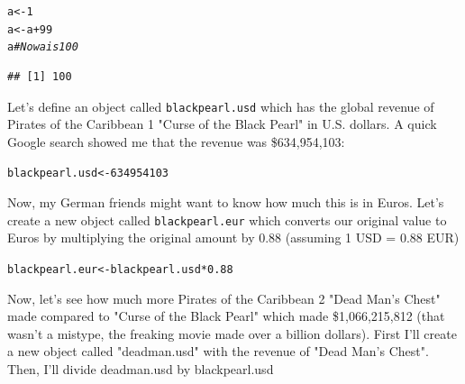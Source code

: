 \documentclass{tufte-book}\usepackage[]{graphicx}\usepackage[]{color}
\makeatletter
\newcommand{\hlnum}[1]{\textcolor[rgb]{0.686,0.059,0.569}{#1}}%
\newcommand{\hlcom}[1]{\textcolor[rgb]{0.678,0.584,0.686}{\textit{#1}}}%
\newcommand{\hlopt}[1]{\textcolor[rgb]{0,0,0}{#1}}%
\newcommand{\hlstd}[1]{\textcolor[rgb]{0.345,0.345,0.345}{#1}}%
\newcommand{\hlkwb}[1]{\textcolor[rgb]{0.69,0.353,0.396}{#1}}%
\newenvironment{kframe}{%
 \def\at@end@of@kframe{}%
 \ifinner\ifhmode%
  \def\at@end@of@kframe{\end{minipage}}%
  \begin{minipage}{\columnwidth}%
 \fi\fi%
 \def\FrameCommand##1{\hskip\@totalleftmargin \hskip-\fboxsep
 \colorbox{shadecolor}{##1}\hskip-\fboxsep
     \hskip-\linewidth \hskip-\@totalleftmargin \hskip\columnwidth}%
 \MakeFramed {\advance\hsize-\width
   \@totalleftmargin\z@ \linewidth\hsize
   \@setminipage}}%
 {\par\unskip\endMakeFramed%
 \at@end@of@kframe}
\newenvironment{knitrout}{}{} %
\makeatother
\begin{document}

\begin{marginfigure}
\begin{knitrout}
\color{fgcolor}\begin{kframe}
\begin{alltt}
\hlstd{a} \hlkwb{<-} \hlnum{1}
\hlstd{a} \hlkwb{<-} \hlstd{a} \hlopt{+} \hlnum{99}
\hlstd{a} \hlcom{# Now a is 100}
\end{alltt}
\begin{verbatim}
## [1] 100
\end{verbatim}
\end{kframe}
\end{knitrout}
\end{marginfigure}


Let's define an object called \texttt{blackpearl.usd} which has the global revenue of Pirates of the Caribbean 1 "Curse of the Black Pearl" in U.S. dollars. A quick Google search showed me that the revenue was \$634,954,103:

\begin{knitrout}
\color{fgcolor}\begin{kframe}
\begin{alltt}
\hlstd{blackpearl.usd} \hlkwb{<-} \hlnum{634954103}
\end{alltt}
\end{kframe}
\end{knitrout}

Now, my German friends might want to know how much this is in Euros. Let's create a new object called \texttt{blackpearl.eur} which converts our original value to Euros by multiplying the original amount by 0.88 (assuming 1 USD = 0.88 EUR)

\begin{knitrout}
\color{fgcolor}\begin{kframe}
\begin{alltt}
\hlstd{blackpearl.eur} \hlkwb{<-} \hlstd{blackpearl.usd} \hlopt{*} \hlnum{0.88}
\end{alltt}
\end{kframe}
\end{knitrout}


Now, let's see how much more Pirates of the Caribbean 2 "Dead Man's Chest" made compared to "Curse of the Black Pearl" which made \$1,066,215,812 (that wasn't a mistype, the freaking movie made over a billion dollars). First I'll create a new object called "deadman.usd" with the revenue of "Dead Man's Chest". Then, I'll divide deadman.usd by blackpearl.usd
\end{document}
